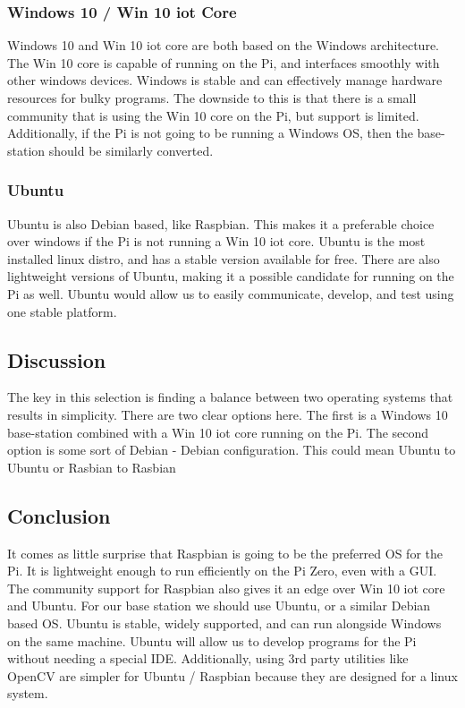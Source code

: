 \documentclass[onecolumn, draftclsnofoot,10pt, compsoc]{IEEEtran}
\begin{document}

\subsubsection{Windows 10 / Win 10 iot Core}

Windows 10 and Win 10 iot core\cite{r6} are both based on the Windows 
architecture. The Win 10 core is capable of running on the Pi, and 
interfaces smoothly with other windows devices. Windows is stable 
and can effectively manage hardware resources for bulky programs. 
The downside to this is that there is a small community that is 
using the Win 10 core on the Pi, but support is limited. 
Additionally, if the Pi is not going to be running a Windows OS, 
then the base-station should be similarly converted. 


\subsubsection{Ubuntu}

Ubuntu\cite{r7} is also Debian based, like Raspbian. This makes it a 
preferable choice over windows if the Pi is not running a Win 10 
iot core. Ubuntu is the most installed linux distro, and has a 
stable version available for free. There are also lightweight 
versions of Ubuntu, making it a possible candidate for running on 
the Pi as well. Ubuntu would allow us to easily communicate, 
develop, and test using one stable platform.  


\subsection{Discussion}

The key in this selection is finding a balance between two 
operating systems that results in simplicity. There are two clear 
options here. The first is a Windows 10 base-station combined with 
a Win 10 iot core running on the Pi. The second option is some sort 
of Debian - Debian configuration. This could mean Ubuntu to Ubuntu 
or Rasbian to Rasbian


\subsection{Conclusion}

It comes as little surprise that Raspbian is going to be the 
preferred OS for the Pi. It is lightweight enough to run 
efficiently on the Pi Zero, even with a GUI. The community support 
for Raspbian also gives it an edge over Win 10 iot core and Ubuntu. 
For our base station we should use Ubuntu, or a similar Debian 
based OS. Ubuntu is stable, widely supported, and can run alongside 
Windows on the same machine. Ubuntu will allow us to develop 
programs for the Pi without needing a special IDE. Additionally, 
using 3rd party utilities like OpenCV are simpler for Ubuntu / 
Raspbian because they are designed for a linux system.  
\end{document}
